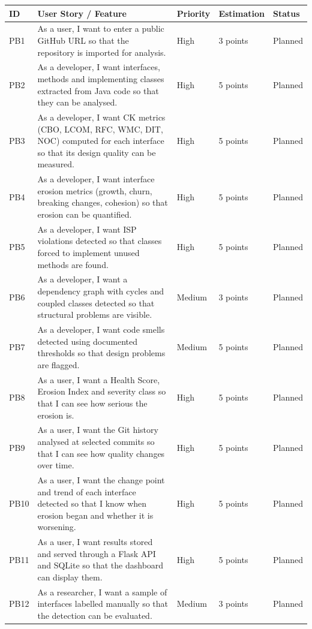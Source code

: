 \documentclass[12pt,a4paper]{article}
\begin{document}
\begingroup\renewcommand{\arraystretch}{1.35}\setlength{\tabcolsep}{4pt}
\begin{longtable}[c]{|L{0.45in}|L{2.6in}|L{0.65in}|L{0.85in}|L{0.7in}|}
\hline
\textbf{ID} & \textbf{User Story / Feature} & \textbf{Priority} & \textbf{Estimation} & \textbf{Status} \\
\hline
\endhead
PB1 & As a user, I want to enter a public GitHub URL so that the repository is imported for analysis. & High & 3 points & Planned \\
\hline
PB2 & As a developer, I want interfaces, methods and implementing classes extracted from Java code so that they can be analysed. & High & 5 points & Planned \\
\hline
PB3 & As a developer, I want CK metrics (CBO, LCOM, RFC, WMC, DIT, NOC) computed for each interface so that its design quality can be measured. & High & 5 points & Planned \\
\hline
PB4 & As a developer, I want interface erosion metrics (growth, churn, breaking changes, cohesion) so that erosion can be quantified. & High & 5 points & Planned \\
\hline
PB5 & As a developer, I want ISP violations detected so that classes forced to implement unused methods are found. & High & 5 points & Planned \\
\hline
PB6 & As a developer, I want a dependency graph with cycles and coupled classes detected so that structural problems are visible. & Medium & 3 points & Planned \\
\hline
PB7 & As a developer, I want code smells detected using documented thresholds so that design problems are flagged. & Medium & 5 points & Planned \\
\hline
PB8 & As a user, I want a Health Score, Erosion Index and severity class so that I can see how serious the erosion is. & High & 5 points & Planned \\
\hline
PB9 & As a user, I want the Git history analysed at selected commits so that I can see how quality changes over time. & High & 5 points & Planned \\
\hline
PB10 & As a user, I want the change point and trend of each interface detected so that I know when erosion began and whether it is worsening. & High & 5 points & Planned \\
\hline
PB11 & As a user, I want results stored and served through a Flask API and SQLite so that the dashboard can display them. & High & 5 points & Planned \\
\hline
PB12 & As a researcher, I want a sample of interfaces labelled manually so that the detection can be evaluated. & Medium & 3 points & Planned \\

\end{longtable}
\end{document}
